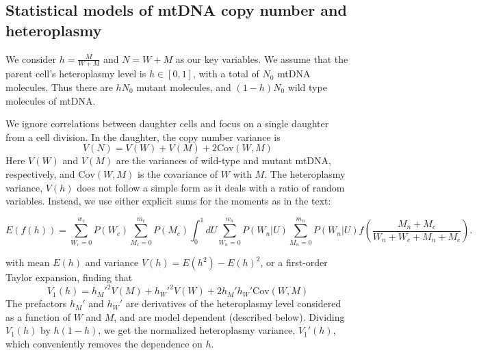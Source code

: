 \documentclass{article}
\begin{document}
\subsection*{Statistical models of mtDNA copy number and heteroplasmy}
We consider $h = \frac{M}{W+M}$ and $N=W+M$ as our key variables. We assume that the parent cell's heteroplasmy level is $h\in [0,1]$, with a total of $N_0$ mtDNA molecules. Thus there are $hN_0$ mutant molecules, and $(1-h)N_0$ wild type molecules of mtDNA. 

We ignore correlations between daughter cells and focus on a single daughter from a cell division. In the daughter, the copy number variance is
\begin{equation}
    V(N) = V(W)+V(M)+2\mathrm{Cov}(W,M)
\end{equation}
Here $V(W)$ and $V(M)$ are the variances of wild-type and mutant mtDNA, respectively, and $\mathrm{Cov}(W,M)$ is the covariance of $W$ with $M$. The heteroplasmy variance, $V(h)$ does not follow a simple form as it deals with a ratio of random variables. Instead, we use either explicit sums for the moments as in the text:

\begin{equation}
    E(f(h)) = \sum_{W_c = 0}^{w_c} P(W_c) \sum_{M_c = 0}^{m_c} P(M_c) \int_0^1 dU \sum_{W_n = 0}^{w_n} P(W_n|U) \sum_{M_n = 0}^{m_n} P(W_n|U) f\left(\frac{M_n+M_c}{W_n+W_c+M_n+M_c}\right).
\end{equation}

with mean $E(h)$ and variance $V(h) = E(h^2) - E(h)^2$, or a first-order Taylor expansion, finding that
\begin{equation}\label{eq:V1hGen}
V_1(h) = h_M'^2V(M)+h_W'^2V(W)+2h_M'h_W'\mathrm{Cov}(W,M)
\end{equation}
The prefactors $h_M'$ and $h_W'$ are derivatives of the heteroplasmy level considered as a function of $W$ and $M$, and are model dependent (described below). Dividing $V_1(h)$ by $h(1-h)$, we get the normalized heteroplasmy variance, $V_1'(h)$, which conveniently removes the dependence on $h$.
\end{document}
